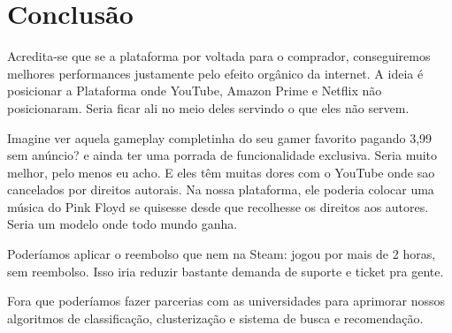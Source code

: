 \section{Conclusão}

Acredita-se que se a plataforma por voltada para o comprador, conseguiremos melhores performances justamente pelo efeito orgânico da internet. A ideia é posicionar a Plataforma onde YouTube, Amazon Prime e Netflix não posicionaram. Seria ficar ali no meio deles servindo o que eles não servem. 

Imagine ver aquela gameplay completinha do seu gamer favorito pagando 3,99 sem anúncio? e ainda ter uma porrada de funcionalidade exclusiva. Seria muito melhor, pelo menos eu acho. E eles têm muitas dores com o YouTube onde sao cancelados por direitos autorais. Na nossa plataforma, ele poderia colocar uma música do Pink Floyd se quisesse desde que recolhesse os direitos aos autores. Seria um modelo onde todo mundo ganha.

Poderíamos aplicar o reembolso que nem na Steam: jogou por mais de 2 horas, sem reembolso. Isso iria reduzir bastante demanda de suporte e ticket pra gente. 

Fora que poderíamos fazer parcerias com as universidades para aprimorar nossos algoritmos de classificação, clusterização e sistema de busca e recomendação. 